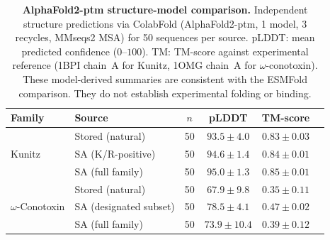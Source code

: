 \documentclass[journal=jcisd8,manuscript=article]{achemso}
\theoremstyle{definition}
\theoremstyle{remark}
\begin{document}
\begin{table}[p]
  \centering
  \caption{\textbf{AlphaFold2-ptm structure-model comparison.}
  Independent structure predictions via ColabFold (AlphaFold2-ptm, 1 model,
  3 recycles, MMseqs2 MSA) for 50 sequences per source.
  pLDDT: mean predicted confidence ($0$--$100$).
  TM: TM-score against experimental reference (1BPI chain~A for Kunitz,
  1OMG chain~A for $\omega$-conotoxin).
  These model-derived summaries are consistent with the ESMFold comparison.
  They do not establish experimental folding or binding.}
  \label{tab:af2-validation}
  \small
  \begin{tabular}{llcccc}
    \toprule
    Family & Source & $n$ & pLDDT & TM-score \\
    \midrule
    \multirow{3}{*}{Kunitz}
      & Stored (natural)       & 50 & $93.5 \pm 4.0$ & $0.83 \pm 0.03$ \\
      & SA (K/R-positive)      & 50 & $94.6 \pm 1.4$ & $0.84 \pm 0.01$ \\
      & SA (full family)       & 50 & $95.0 \pm 1.3$ & $0.85 \pm 0.01$ \\
    \midrule
    \multirow{3}{*}{$\omega$-Conotoxin}
      & Stored (natural)       & 50 & $67.9 \pm 9.8$ & $0.35 \pm 0.11$ \\
      & SA (designated subset) & 50 & $78.5 \pm 4.1$ & $0.47 \pm 0.02$ \\
      & SA (full family)       & 50 & $73.9 \pm 10.4$ & $0.39 \pm 0.12$ \\
    \bottomrule
  \end{tabular}
\end{table}
\end{document}
